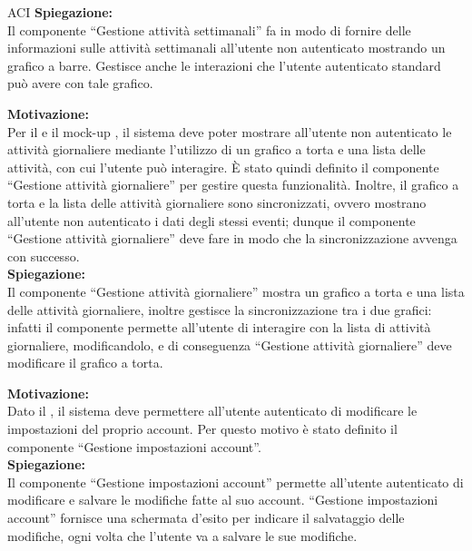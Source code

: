 \begin{listaPersonale}{ACI}
    \textbf{Spiegazione:}\\
    Il componente “Gestione attività settimanali” fa in modo di fornire delle informazioni sulle attività settimanali all'utente non autenticato mostrando un grafico a barre. Gestisce anche le interazioni che l'utente autenticato standard può avere con tale grafico.



    \textbf{Motivazione:}\\
    Per il  e il mock-up , il sistema deve poter mostrare all'utente non autenticato le attività giornaliere mediante l'utilizzo di un grafico a torta e una lista delle attività, con cui l'utente può interagire. È stato quindi definito il componente “Gestione attività giornaliere” per gestire questa funzionalità. Inoltre, il grafico a torta e la lista delle attività giornaliere sono sincronizzati, ovvero mostrano all'utente non autenticato i dati degli stessi eventi; dunque il componente “Gestione attività giornaliere” deve fare in modo che la sincronizzazione avvenga con successo.\\
    \textbf{Spiegazione:}\\
    Il componente “Gestione attività giornaliere” mostra un grafico a torta e una lista delle attività giornaliere, inoltre gestisce la sincronizzazione tra i due grafici: infatti il componente permette all'utente di interagire con la lista di attività giornaliere, modificandolo, e di conseguenza “Gestione attività giornaliere” deve modificare il grafico a torta.



    \textbf{Motivazione:}\\
    Dato il , il sistema deve permettere all'utente autenticato di modificare le impostazioni del proprio account. Per questo motivo è stato definito il componente “Gestione impostazioni account”.\\
    \textbf{Spiegazione:}\\
    Il componente “Gestione impostazioni account” permette all'utente autenticato di modificare e salvare le modifiche fatte al suo account.
    “Gestione impostazioni account” fornisce una schermata d'esito per indicare il salvataggio delle modifiche, ogni volta che l'utente va a salvare le sue modifiche.



\end{listaPersonale}
